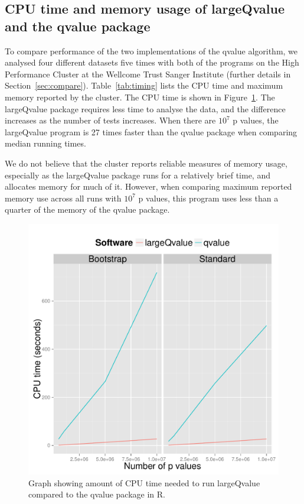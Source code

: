 \documentclass{amsart}
\begin{document}
\subsection{CPU time and memory usage of largeQvalue and the qvalue package}

\noindent To compare performance of the two implementations of the qvalue algorithm, we analysed four different datasets five times with both of the programs on the High Performance Cluster at the Wellcome Trust Sanger Institute (further details in Section~\ref{sec:compare}). Table~\ref{tab:timing} lists the CPU time and maximum memory reported by the cluster. The CPU time is shown in Figure~\ref{fig:time}. The largeQvalue package requires less time to analyse the data, and the difference increases as the number of tests increases. When there are $10^7$ p values, the largeQvalue program is 27 times faster than the qvalue package when comparing median running times.

We do not believe that the cluster reports reliable measures of memory usage, especially as the largeQvalue package runs for a relatively brief time, and allocates memory for much of it. However, when comparing maximum reported memory use across all runs with $10^7$ p values, this program uses less than a quarter of the memory of the qvalue package.

\begin{figure}
  \centering
  \includegraphics[width=\textwidth]{Timings}
  \caption{Graph showing amount of CPU time needed to run largeQvalue compared to the qvalue package in R.}
  \label{fig:time}
\end{figure}
\end{document}
